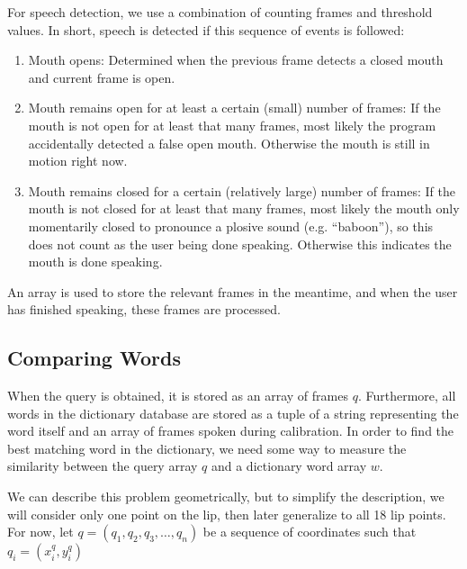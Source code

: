 \documentclass[10pt,twocolumn,letterpaper]{article}
\begin{document}
For speech detection, we use a combination of counting frames and threshold values. In short, speech is detected if this sequence of events is followed:
\begin{enumerate}
\item Mouth opens: Determined when the previous frame detects a closed mouth and current frame is open.
\item Mouth remains open for at least a certain (small) number of frames: If the mouth is not open for at least that many frames, most likely the program accidentally detected a false open mouth. Otherwise the mouth is still in motion right now.
\item Mouth remains closed for a certain (relatively large) number of frames: If the mouth is not closed for at least that many frames, most likely the mouth only momentarily closed to pronounce a plosive sound (e.g. “baboon”), so this does not count as the user being done speaking. Otherwise this indicates the mouth is done speaking.
\end{enumerate}
An array is used to store the relevant frames in the meantime, and when the user has finished speaking, these frames are processed.

\subsection{Comparing Words}
When the query is obtained, it is stored as an array of frames $q$. Furthermore, all words in the dictionary database are stored as a tuple of a string representing the word itself and an array of frames spoken during calibration. In order to find the best matching word in the dictionary, we need some way to measure the similarity between the query array $q$ and a dictionary word array $w$.

We can describe this problem geometrically, but to simplify the description, we will consider only one point on the lip, then later generalize to all 18 lip points. For now, let $q = (q_1, q_2, q_3, \ldots, q_n)$ be a sequence of coordinates such that $q_i = (x_i^q, y_i^q)$
{\small


}
\end{document}
